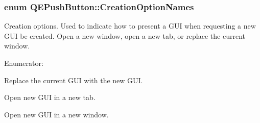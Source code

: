 \hypertarget{classQEPushButton_a739432b8d095d67512aae5d81fcea094}{
\subsubsection[{CreationOptionNames}]{\setlength{\rightskip}{0pt plus 5cm}enum {\bf QEPushButton::CreationOptionNames}}}
\label{classQEPushButton_a739432b8d095d67512aae5d81fcea094}


Creation options. Used to indicate how to present a GUI when requesting a new GUI be created. Open a new window, open a new tab, or replace the current window. 

\begin{Desc}
\item[Enumerator: ]\par
\begin{description}
\item[{\em 
\hypertarget{classQEPushButton_a739432b8d095d67512aae5d81fcea094a095891158cfa4ba63246074dc5604756}{
Open}
\label{classQEPushButton_a739432b8d095d67512aae5d81fcea094a095891158cfa4ba63246074dc5604756}
}]Replace the current GUI with the new GUI. \item[{\em 
\hypertarget{classQEPushButton_a739432b8d095d67512aae5d81fcea094a3ac54242401c23c28769906fb0425cfa}{
NewTab}
\label{classQEPushButton_a739432b8d095d67512aae5d81fcea094a3ac54242401c23c28769906fb0425cfa}
}]Open new GUI in a new tab. \item[{\em 
\hypertarget{classQEPushButton_a739432b8d095d67512aae5d81fcea094abc24475fd9e104561f55af238ba71431}{
NewWindow}
\label{classQEPushButton_a739432b8d095d67512aae5d81fcea094abc24475fd9e104561f55af238ba71431}
}]Open new GUI in a new window. \end{description}
\end{Desc}


